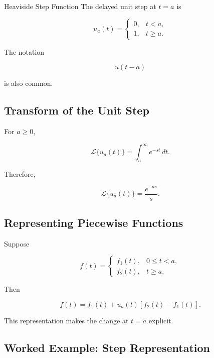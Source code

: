 \begin{definitionbox}{Heaviside Step Function}
The delayed unit step at \(t=a\) is

\[
\boxed{
u_a(t)
=
\begin{cases}
0,
&
t<a,
\\
1,
&
t\geq a.
\end{cases}
}
\]
\end{definitionbox}

The notation

\[
u(t-a)
\]

is also common.

\subsection{Transform of the Unit Step}
\label{subsec:laplace-unit-step}

For \(a\geq0\),

\[
\mathcal{L}\{u_a(t)\}
=
\int_a^\infty
e^{-st}\,dt.
\]

Therefore,

\[
\boxed{
\mathcal{L}\{u_a(t)\}
=
\frac{
e^{-as}
}{
s
}.
}
\]

\subsection{Representing Piecewise Functions}
\label{subsec:step-function-representation}

Suppose

\[
f(t)
=
\begin{cases}
f_1(t),
&
0\leq t<a,
\\
f_2(t),
&
t\geq a.
\end{cases}
\]

Then

\[
\boxed{
f(t)
=
f_1(t)
+
u_a(t)
[
f_2(t)-f_1(t)
].
}
\]

This representation makes the change at \(t=a\) explicit.

\subsection{Worked Example: Step Representation}
\label{subsec:worked-step-representation}

